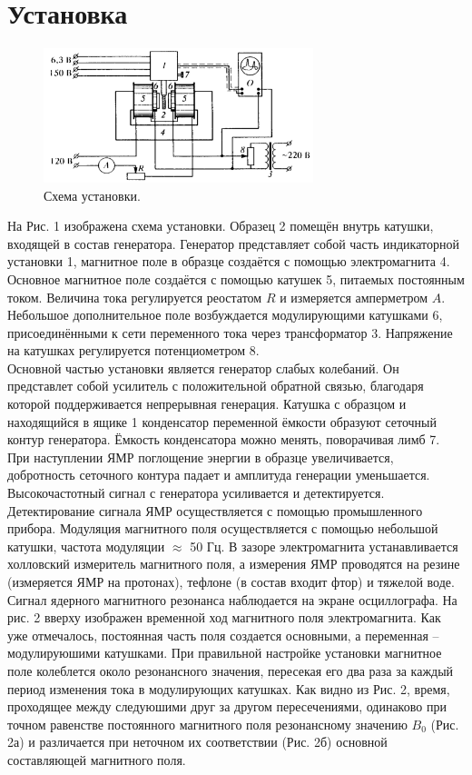 \documentclass[a4paper,12pt]{article}
\theoremstyle{definition}
\begin{document}
\section*{Установка}
\begin{figure}[h]
\includegraphics[width=0.7\textwidth]{1.png}
\centering
\caption{Схема установки.}
\end{figure}
На Рис. 1 изображена схема установки. Образец 2 помещён внутрь катушки, входящей в состав генератора. Генератор представляет собой часть индикаторной установки 1, магнитное поле в образце создаётся с помощью электромагнита 4. Основное магнитное поле создаётся с помощью катушек 5, питаемых постоянным током. Величина тока регулируется реостатом $R$ и измеряется амперметром $A$. Небольшое дополнительное поле возбуждается модулирующими катушками 6, присоединёнными к сети переменного тока через трансформатор 3. Напряжение на катушках регулируется потенциометром 8.\\
Основной частью установки является генератор слабых колебаний. Он представлет собой усилитель с положительной обратной связью, благодаря которой поддерживается непрерывная генерация. Катушка с образцом и находящийся в ящике 1 конденсатор переменной ёмкости образуют сеточный контур генератора. Ёмкость конденсатора можно менять, поворачивая лимб 7. При наступлении ЯМР поглощение энергии в образце увеличивается, добротность сеточного контура падает и амплитуда генерации уменьшается. Высокочастотный сигнал с генератора усиливается и детектируется.\\
Детектирование сигнала ЯМР осуществляется с помощью промышленного прибора. Модуляция магнитного поля осуществляется с помощью небольшой катушки, частота модуляции $\approx$ 50 Гц. В зазоре электромагнита устанавливается холловский измеритель магнитного поля, а измерения ЯМР проводятся на резине (измеряется ЯМР на протонах), тефлоне (в состав входит фтор) и тяжелой воде.\\
Сигнал ядерного магнитного резонанса наблюдается на экране осциллографа. На рис. 2 вверху изображен временной ход магнитного поля электромагнита. Как уже отмечалось, постоянная часть поля создается основными, а переменная -- модулируюшими катушками. При правильной настройке установки магнитное поле колеблется около резонансного значения, пересекая его два раза за каждый период изменения тока в модулирующих катушках. Как видно из Рис. 2, время, проходящее между следуюшими друг за другом пересечениями, одинаково при точном равенстве постоянного магнитного поля резонансному значению $B_{0}$ (Рис. 2а) и различается при неточном их соответствии (Рис. 2б) основной составляющей магнитного поля.
\end{document}
